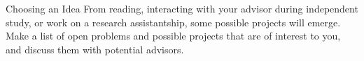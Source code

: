 \begin{frame}{Choosing an Idea}
  From reading, interacting with your advisor during independent study, or work
  on a research assistantship, some possible projects will emerge. Make a list of
  open problems and possible projects that are of interest to you, and discuss
  them with potential advisors.
\end{frame}
